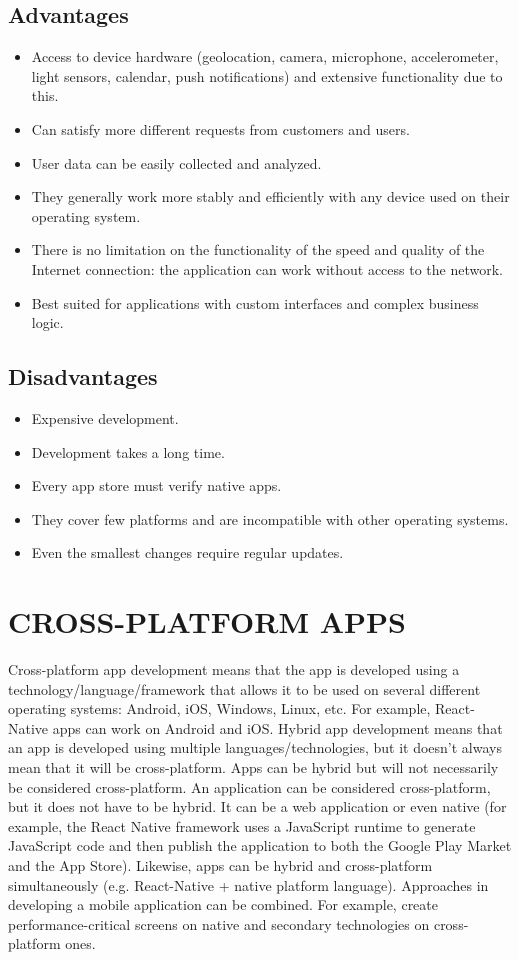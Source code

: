 \documentclass[conference]{IEEEtran}
\begin{document}
\subsection{Advantages}
\begin{itemize} 
\item Access to device hardware (geolocation, camera, microphone, accelerometer, light sensors, calendar, push notifications) and extensive functionality due to this.
\item Can satisfy more different requests from customers and users.
\item User data can be easily collected and analyzed.
\item They generally work more stably and efficiently with any device used on their operating system.
\item There is no limitation on the functionality of the speed and quality of the Internet connection: the application can work without access to the network.
\item Best suited for applications with custom interfaces and complex business logic.
\end{itemize}

\subsection{Disadvantages}
\begin{itemize}
\item Expensive development.
\item Development takes a long time.
\item Every app store must verify native apps.
\item They cover few platforms and are incompatible with other operating systems.
\item Even the smallest changes require regular updates.
\end{itemize}

\section{CROSS-PLATFORM APPS}
Cross-platform app development means that the app is developed using a technology/language/framework that allows it to be used on several different operating systems: Android, iOS, Windows, Linux, etc. For example, React-Native apps can work on Android and iOS.
Hybrid app development means that an app is developed using multiple languages/technologies, but it doesn't always mean that it will be cross-platform. Apps can be hybrid but will not necessarily be considered cross-platform.
An application can be considered cross-platform, but it does not have to be hybrid. It can be a web application or even native (for example, the React Native framework uses a JavaScript runtime to generate JavaScript code and then publish the application to both the Google Play Market and the App Store).
Likewise, apps can be hybrid and cross-platform simultaneously (e.g. React-Native + native platform language).
Approaches in developing a mobile application can be combined. For example, create performance-critical screens on native and secondary technologies on cross-platform ones.
\end{document}
